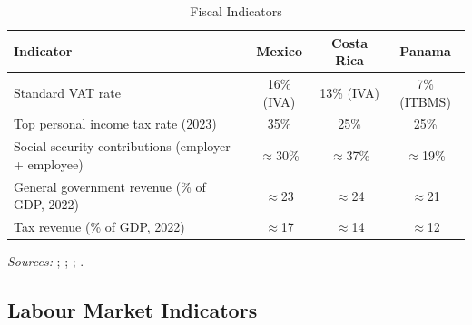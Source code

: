 \documentclass[12pt,a4paper]{article}
\begin{document}
\begin{appendices}
\begin{table}[H]
\centering
\caption{Fiscal Indicators}
\label{tab:fiscal}
\begin{tabular}{lccc}
\hline\hline
\textbf{Indicator} & \textbf{Mexico} & \textbf{Costa Rica} & \textbf{Panama} \\
\hline
Standard VAT rate                                  & 16\% (IVA) & 13\% (IVA) & 7\% (ITBMS) \\
Top personal income tax rate (2023)                & 35\%  & 25\%  & 25\%  \\
Social security contributions (employer + employee) & $\approx$30\% & $\approx$37\% & $\approx$19\% \\
General government revenue (\% of GDP, 2022)       & $\approx$23 & $\approx$24 & $\approx$21 \\
Tax revenue (\% of GDP, 2022)                      & $\approx$17 & $\approx$14 & $\approx$12 \\
\hline\hline
\end{tabular}
\begin{minipage}{\linewidth}
\smallskip
\footnotesize
\textit{Sources:} \citet{PwCWWTS2024}; \citet{OECDRevStats2024};
\citet{WorldBankWDI2024}; \citet{CCSS2023}.
\end{minipage}
\end{table}

\subsection{Labour Market Indicators}
\label{app:labour_table}


\end{appendices}
\end{document}
